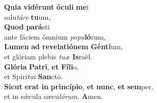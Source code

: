 \evenverse \textbf{Qui}\textbf{a} \textbf{vi}\textbf{dé}\textbf{runt} \textbf{ó}\textbf{cu}\textbf{li} \textbf{me}i~\*\\
\evenverse salu\textit{tá}\textit{re} \textbf{tu}um,\\
\oddverse \textbf{Quod} \textbf{pa}\textbf{rá}sti~\*\\
\oddverse ante fáciem ómnium \textit{po}\textit{pu}\textbf{ló}rum,\\
\evenverse \textbf{Lu}\textbf{men} \textbf{ad} \textbf{re}\textbf{ve}\textbf{la}\textbf{ti}\textbf{ó}\textbf{nem} \textbf{Gén}\textbf{ti}um,~\*\\
\evenverse et glóriam plebis \textit{tu}\textit{æ} \textbf{Is}raël.\\
\oddverse \textbf{Gló}\textbf{ri}\textbf{a} \textbf{Pa}\textbf{tri}, \textbf{et} \textbf{Fí}\textbf{li}o,~\*\\
\oddverse et Spirí\textit{tu}\textit{i} \textbf{San}cto.\\
\evenverse \textbf{Si}\textbf{cut} \textbf{e}\textbf{rat} \textbf{in} \textbf{prin}\textbf{cí}\textbf{pi}\textbf{o}, \textbf{et} \textbf{nunc}, \textbf{et} \textbf{sem}per,~\*\\
\evenverse et in sǽcula sæcu\textit{ló}\textit{rum}. \textbf{A}men.\\
